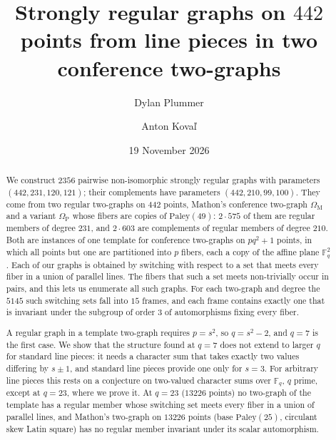 \documentclass[11pt]{amsart}
\title[Strongly regular graphs on 442 points]{Strongly regular graphs on $442$ points from line pieces
in two conference two-graphs}
\author{Dylan Plummer}
\author{Anton Kova\v{l}}
\date{19 November 2026}
\theoremstyle{definition}
\theoremstyle{remark}
\newcommand{\F}{\mathbb{F}}
\newcommand{\Pal}{\mathrm{Paley}}
\newcommand{\OM}{\Omega_{\mathrm M}}   %
\newcommand{\OP}{\Omega_{\mathrm P}}   %
\begin{document}
\begin{abstract}
We construct $2356$ pairwise non-isomorphic strongly regular graphs with parameters $(442,231,120,121)$; their
complements have parameters $(442,210,99,100)$. They come from two regular two-graphs on $442$ points, Mathon's
conference two-graph $\OM$ and a variant $\OP$ whose fibers are copies of $\Pal(49)$: $2\cdot575$ of them are regular
members of degree $231$, and $2\cdot603$ are complements of regular members of degree $210$. Both are instances of one
template for conference two-graphs on $pq^2+1$ points, in which all points but one are partitioned into $p$ fibers,
each a copy of the affine plane $\F_q^2$. Each of our graphs is obtained by switching with respect to a set that meets
every fiber in a union of parallel lines. The fibers that such a set meets non-trivially occur in pairs, and this lets
us enumerate all such graphs. For each two-graph and degree the $5145$ such switching sets fall into $15$ frames, and each
frame contains exactly one that is invariant under the subgroup of order $3$ of automorphisms fixing every fiber.

A regular graph in a template two-graph requires $p=s^2$, so $q=s^2-2$, and $q=7$ is the first case. We show that the
structure found at $q=7$ does not extend to larger $q$ for standard line pieces: it needs a character sum that takes
exactly two values differing by $s\pm1$, and standard line pieces provide one only for $s=3$. For arbitrary line pieces
this rests on a conjecture on two-valued character sums over $\F_q$, $q$ prime, except at $q=23$, where we prove it. At $q=23$ ($13226$ points) no
two-graph of the template has a regular member whose switching set meets every fiber in a union of parallel lines, and
Mathon's two-graph on $13226$ points (base $\Pal(25)$, circulant skew Latin square) has no regular member invariant
under its scalar automorphism.
\end{abstract}
\maketitle
\end{document}
